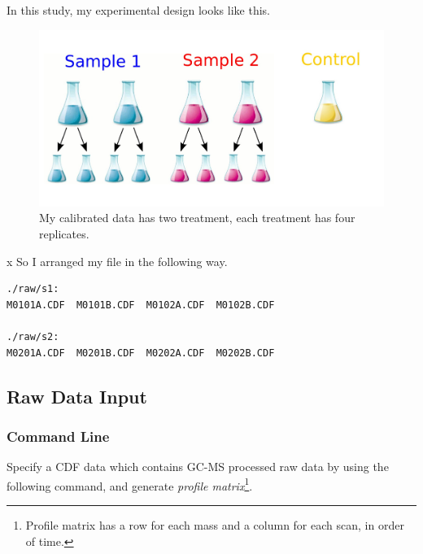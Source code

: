 \documentclass[11pt,a4paper]{article}
\begin{document}


In this study, my experimental design looks like this.

\begin{figure}[h!t!b!p]
\begin{center}
  \includegraphics[bb=0 0 1666 853,scale=0.25]{design.jpg}
\caption{\label{fig:genprofile}My calibrated data has two treatment, each treatment has four replicates.}
\end{center}
\end{figure}
x
So I arranged my file in the following way.
\begin{verbatim}
./raw/s1:
M0101A.CDF  M0101B.CDF  M0102A.CDF  M0102B.CDF

./raw/s2:
M0201A.CDF  M0201B.CDF  M0202A.CDF  M0202B.CDF
\end{verbatim}
\newpage

\subsection{Raw Data Input}
\subsubsection*{Command Line}
Specify a CDF data which contains GC-MS processed raw data by using
the following command, and generate \emph{profile
  matrix}\footnote[1]{Profile matrix has a row for each mass and a
  column for each scan, in order of time.}.
\end{document}
